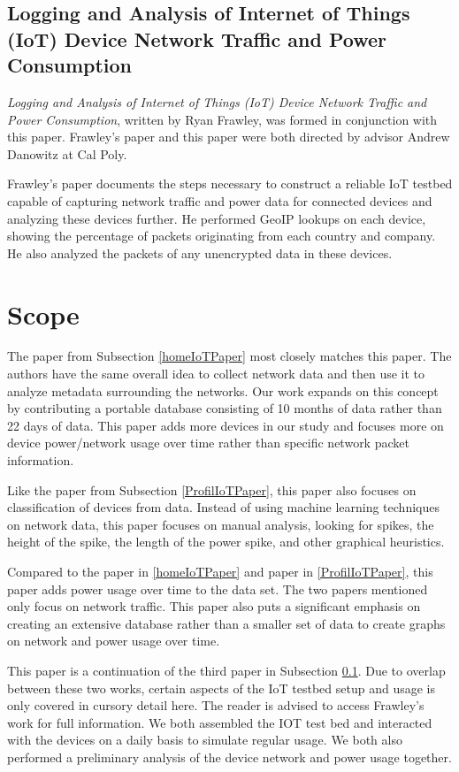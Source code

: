 \subsection{Logging and Analysis of Internet of Things (IoT) Device Network Traffic and Power Consumption}
\label{frawleyPaper}
\textit{Logging and Analysis of Internet of Things (IoT) Device Network Traffic and Power Consumption}\cite{frawley_2018}, written by Ryan Frawley, was formed in conjunction with this paper. Frawley's paper and this paper were both directed by advisor Andrew Danowitz at Cal Poly.

Frawley's paper documents the steps necessary to construct a reliable IoT testbed capable of capturing network traffic and power data for connected devices and analyzing these devices further. He performed GeoIP\cite{maxmind} lookups on each device, showing the percentage of packets originating from each country and company. He also analyzed the packets of any unencrypted data in these devices.

\section{Scope}
\label{Scope}
The paper from Subsection \ref{homeIoTPaper} most closely matches this paper. The authors have the same overall idea to collect network data and then use it to analyze metadata surrounding the networks. Our work expands on this concept by contributing a portable database consisting of 10 months of data rather than 22 days of data. This paper adds more devices in our study and focuses more on device power/network usage over time rather than specific network packet information.

Like the paper from Subsection \ref{ProfilIoTPaper}, this paper also focuses on classification of devices from data. Instead of using machine learning techniques on network data, this paper focuses on manual analysis, looking for spikes, the height of the spike, the length of the power spike, and other graphical heuristics.

Compared to the paper in \ref{homeIoTPaper} and paper in \ref{ProfilIoTPaper}, this paper adds power usage over time to the data set. The two papers mentioned only focus on network traffic. This paper also puts a significant emphasis on creating an extensive database rather than a smaller set of data to create graphs on network and power usage over time.

This paper is a continuation of the third paper in Subsection \ref{frawleyPaper}. Due to overlap between these two works, certain aspects of the IoT testbed setup and usage is only covered in cursory detail here. The reader is advised to access Frawley's work for full information. We both assembled the IOT test bed and interacted with the devices on a daily basis to simulate regular usage. We both also performed a preliminary analysis of the device network and power usage together.

